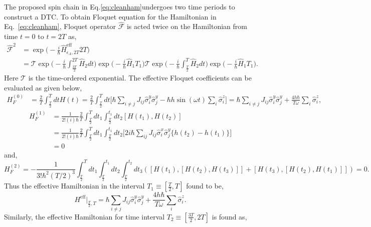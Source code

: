 \documentclass[%
nofootinbib,
reprint,
superscriptaddress,
amsmath,amssymb,showkeys,
aps,
prb,
]{revtex4-2}
\begin{document}
	The proposed spin chain in Eq.\eqref{eq:cleanham}undergoes two time periods to construct a DTC. To obtain Floquet equation for the Hamiltonian in Eq.~\ref{eq:cleanham}, Floquet operator $\hat{\mathcal{F}}$ is acted twice on the Hamiltonian from time $t=0$ to $t=2T$ as,
	\begin{align*}
		\hat{\mathcal{F}}^2 &= \exp\Big(-\frac{i}{\hbar}\hat{H}_{\epsilon_A, 2T}^{\mathrm{eff}}2T\Big)\\ 
		&= \mathcal{T}\exp\Big(-\frac{i}{\hbar}\int_{\frac{3T}{2}}^{2T}\hat{H}_2 dt\Big)
		\exp\Big(-\frac{i}{\hbar}\hat{H}_1T_1\Big)\mathcal{T}\exp\Big(-\frac{i}{\hbar}\int_{\frac{T}{2}}^{T}\hat{H}_2 dt\Big)\exp\Big(-\frac{i}{\hbar}\hat{H}_1T_1\Big).
		\label{}
	\end{align*}
	Here $\mathcal{T}$ is the time-ordered exponential. The effective Floquet coefficients can be evaluated as given below,	
	\begin{align}
		H_F^{(0)} &= \frac{2}{T} \int_{\frac{T}{2}}^{T} dt H(t) = \frac{2}{T} \int_{\frac{T}{2}}^{T} dt \Bigg[\hbar\sum_{i\neq j} J_{ij} \hat{\sigma}^y_i \hat{\sigma}^y_j -\hbar h\sin(\omega t) \sum_i\hat{\sigma}^z_i\Bigg]= \hbar\sum_{i\neq j} J_{ij} \hat{\sigma}^y_i \hat{\sigma}^y_j + \frac{4h\hbar}{T \omega}\sum_i\hat{\sigma}^z_i,
	\end{align}	
	\begin{align}
		H_F^{(1)} &= \frac{1}{2!(i)\hbar} \frac{2}{T} \int_{\frac{T}{2}}^{T} dt_1  \int_{\frac{T}{2}}^{t_1} dt_2 [H(t_1), H(t_2)]\nonumber\\
		&= \frac{1}{2!(i)\hbar} \frac{2}{T}\int_{\frac{T}{2}}^{T} dt_1 \int_{\frac{T}{2}}^{t_1} dt_2\Bigg[2i\hbar\sum_{ij}^{}J_{ij}\hat{\sigma}^x_i\hat{\sigma}^y_j\Big\{h(t_2) -h(t_1)\Big\}\Bigg]\nonumber\\
		&= 0
	\end{align}	
	and,
	\begin{equation}
		H_F^{(2)} = -\frac{1}{3!\hbar^2 (T/2)^3} \int_{\frac{T}{2}}^{T} dt_1  \int_{{\frac{T}{2}}}^{t_1} dt_2 \int_{\frac{T}{2}}^{t_2} dt_3([H(t_1),[H(t_2), H(t_3)]] + [H(t_3),[H(t_2), H(t_1)]])= 0.    
	\end{equation}
	Thus the effective Hamiltonian in the interval $T_1\equiv[\frac{T}{2}, T]$ found to be,	
	\begin{equation}
		H^{\mathrm{eff}}\vert_{\frac{T}{2}, T} =  \hbar\sum_{i\neq j} J_{ij} \hat{\sigma}^y_i \hat{\sigma}^y_{j} + \frac{4h\hbar}{T \omega}\sum_i\hat{\sigma}^z_i.
	\end{equation} 	
	Similarly, the effective Hamiltonian for time interval $T_2\equiv[\frac{3T}{2}, 2T]$ is found as,	
\end{document}
